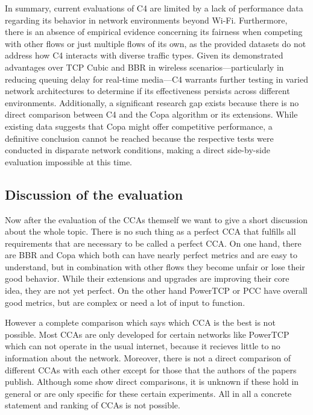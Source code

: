 In summary, current evaluations of C4 are limited by a lack of performance data regarding its behavior in network environments beyond Wi-Fi. 
Furthermore, there is an absence of empirical evidence concerning its fairness when competing with other flows or just multiple flows of its own, as the provided datasets do not address how C4 interacts with diverse traffic types. 
Given its demonstrated advantages over TCP Cubic and BBR in wireless scenarios—particularly in reducing queuing delay for real-time media—C4 warrants further testing in varied network architectures to determine if its effectiveness persists across different environments. 
Additionally, a significant research gap exists because there is no direct comparison between C4 and the Copa algorithm or its extensions. 
While existing data suggests that Copa might offer competitive performance, a definitive conclusion cannot be reached because the respective tests were conducted in disparate network conditions, making a direct side-by-side evaluation impossible at this time.

\subsection{Discussion of the evaluation}

Now after the evaluation of the \ac{CCA}s themself we want to give a short discussion about the whole topic.
There is no such thing as a perfect \ac{CCA} that fulfills all requirements that are necessary to be called a perfect \ac{CCA}.
On one hand, there are BBR and Copa which both can have nearly perfect metrics and are easy to understand, but in combination with other flows they become unfair or lose their good behavior.
While their extensions and upgrades are improving their core idea, they are not yet perfect.
On the other hand PowerTCP or PCC have overall good metrics, but are complex or need a lot of input to function.

However a complete comparison which says which \ac{CCA} is the best is not possible.
Most \ac{CCA}s are only developed for certain networks like PowerTCP which can not operate in the usual internet, because it recieves little to no information about the network.
Moreover, there is not a direct comparison of different \ac{CCA}s with each other except for those that the authors of the papers publish.
Although some show direct comparisons, it is unknown if these hold in general or are only specific for these certain experiments.
All in all a concrete statement and ranking of \ac{CCA}s is not possible.
